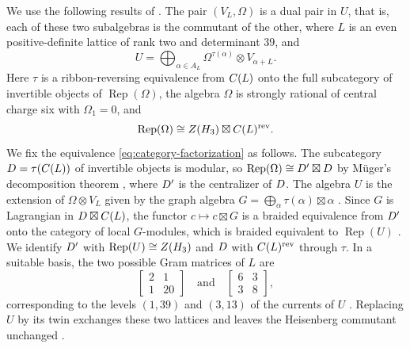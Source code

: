 \documentclass[leqno]{article}
\let\cal\relax
\newcommand{\cal}{\mathcal}
\newcommand{\ot}{\otimes}
\DeclareMathOperator{\Rep}{Rep}
\numberwithin{equation}{section}
\begin{document}
We use the following results of \cite[Section 12]{Arh26a}. The pair $(V_L,\Omega)$ is a dual pair in $U$, that is, each of these two subalgebras is the commutant of the other, where $L$ is an even positive-definite lattice of rank two and determinant $39$, and \cite[Proposition 12.2 p.~62]{Arh26a}
\begin{equation}
\label{eq:branching}
U = \bigoplus_{\alpha \in A_L} \Omega^{\tau(\alpha)} \ot V_{\alpha+L}.
\end{equation}
Here $\tau$ is a ribbon-reversing equivalence from $\cal C(L)$ onto the full subcategory of invertible objects of $\Rep(\Omega)$, the algebra $\Omega$ is strongly rational of central charge six with $\Omega_1 = 0$, and
\begin{equation}
\label{eq:category-factorization}
\Rep(\Omega) \cong Z(\cal H_3) \boxtimes \cal C(L)^{\mathrm{rev}}.
\end{equation}
We fix the equivalence \eqref{eq:category-factorization} as follows. The subcategory $\cal D = \tau(\cal C(L))$ of invertible objects is modular, so $\Rep(\Omega) \cong \cal D' \boxtimes \cal D$ by Müger's decomposition theorem \cite{Mu03}, where $\cal D'$ is the centralizer of $\cal D$. The algebra $U$ is the extension of $\Omega \ot V_L$ given by the graph algebra $G = \bigoplus_\alpha \tau(\alpha) \boxtimes \alpha$ \cite{HKL15}. Since $G$ is Lagrangian in $\cal D \boxtimes \cal C(L)$, the functor $c \mapsto c \boxtimes G$ is a braided equivalence from $\cal D'$ onto the category of local $G$-modules, which is braided equivalent to $\Rep(U)$ \cite{HKL15}. We identify $\cal D'$ with $\Rep(U) \cong Z(\cal H_3)$ and $\cal D$ with $\cal C(L)^{\mathrm{rev}}$ through $\tau$. In a suitable basis, the two possible Gram matrices of $L$ are \cite[Lemma 12.1 p.~61]{Arh26a}
\begin{equation}
\label{eq:binary-grams}
\begin{bmatrix}2&1\\1&20\end{bmatrix}
\quad\text{and}\quad
\begin{bmatrix}6&3\\3&8\end{bmatrix},
\end{equation}
corresponding to the levels $(1,39)$ and $(3,13)$ of the currents of $U$ \cite[Theorem 8.5 p.~23 and Proposition 12.2(3) p.~62]{Arh26a}. Replacing $U$ by its twin exchanges these two lattices and leaves the Heisenberg commutant unchanged \cite[Theorem 12.3(1) p.~64]{Arh26a}.
\end{document}
